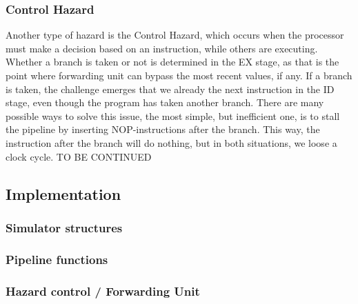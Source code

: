 \subsubsection{Control Hazard}
Another type of hazard is the Control Hazard, which occurs when the processor
must make a decision based on an instruction, while others are executing.
Whether a branch is taken or not is determined in the EX stage, as that is the
point where forwarding unit can bypass the most recent values, if any. If a
branch is taken, the challenge emerges that we already the next instruction in
the ID stage, even though the program has taken another branch. There are many
possible ways to solve this issue, the most simple, but inefficient one, is to
stall the pipeline by inserting NOP-instructions after the branch. This way,
the instruction after the branch will do nothing, but in both situations, we
loose a clock cycle. TO BE CONTINUED


\subsection{Implementation}
\subsubsection{Simulator structures}
\subsubsection{Pipeline functions}
\subsubsection{Hazard control / Forwarding Unit}
